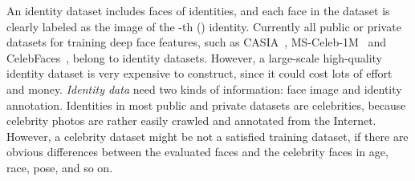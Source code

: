 \documentclass[conference]{acmsiggraph}
\begin{document}
An identity dataset includes  faces of  identities, and each face in the dataset is clearly labeled as the image of the -th () identity. Currently all public or private datasets for training deep face features, such as CASIA~\cite{casia}, MS-Celeb-1M~\cite{msceleb} and CelebFaces~\cite{deepid2}, belong to identity datasets. However, a large-scale high-quality identity dataset is very expensive to construct, since it could cost lots of effort and money. \emph{Identity data} need two kinds of information: face image and identity annotation. Identities in most public and private datasets are celebrities, because celebrity photos are rather easily crawled and annotated from the Internet. However, a celebrity dataset might be not a satisfied training dataset, if there are obvious differences between the evaluated faces and the celebrity faces in age, race, pose, and so on.
\end{document}
